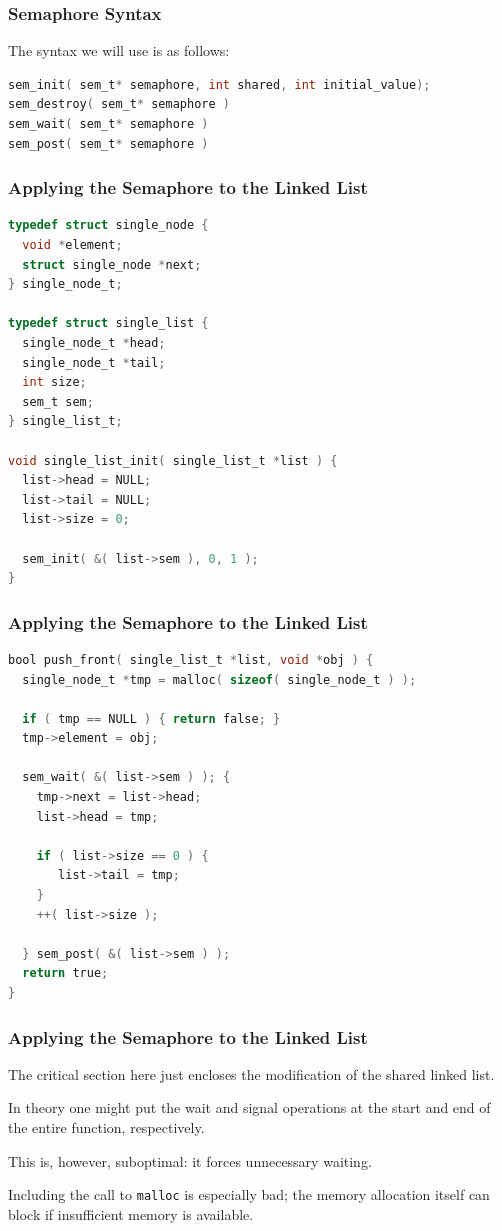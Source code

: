 \begin{frame}[fragile]
	\frametitle{Semaphore Syntax}

	The syntax we will use is as follows:

	\begin{lstlisting}[language=C]
sem_init( sem_t* semaphore, int shared, int initial_value);
sem_destroy( sem_t* semaphore )
sem_wait( sem_t* semaphore )
sem_post( sem_t* semaphore )
\end{lstlisting}

\end{frame}

\begin{frame}[fragile]
	\frametitle{Applying the Semaphore to the Linked List}

	\begin{lstlisting}[language=C]
typedef struct single_node {
  void *element;
  struct single_node *next;
} single_node_t;

typedef struct single_list {
  single_node_t *head;
  single_node_t *tail;
  int size;
  sem_t sem;
} single_list_t;

void single_list_init( single_list_t *list ) {
  list->head = NULL;
  list->tail = NULL;
  list->size = 0;

  sem_init( &( list->sem ), 0, 1 );
}
\end{lstlisting}

\end{frame}

\begin{frame}[fragile]
	\frametitle{Applying the Semaphore to the Linked List}

	\begin{lstlisting}[language=C]
bool push_front( single_list_t *list, void *obj ) {
  single_node_t *tmp = malloc( sizeof( single_node_t ) );
  
  if ( tmp == NULL ) { return false; }  
  tmp->element = obj;

  sem_wait( &( list->sem ) ); {  
    tmp->next = list->head;
    list->head = tmp;

    if ( list->size == 0 ) {
       list->tail = tmp;
    }
    ++( list->size );
  
  } sem_post( &( list->sem ) );
  return true;
}
\end{lstlisting}


\end{frame}

\begin{frame}
	\frametitle{Applying the Semaphore to the Linked List}

	The critical section here just encloses the modification of the shared linked list.

	In theory one might put the wait and signal operations at the start and end of the entire function, respectively.

	This is, however, suboptimal: it forces unnecessary waiting.

	Including the call to \texttt{malloc} is especially bad; the memory allocation itself can block if insufficient memory is available.

\end{frame}



